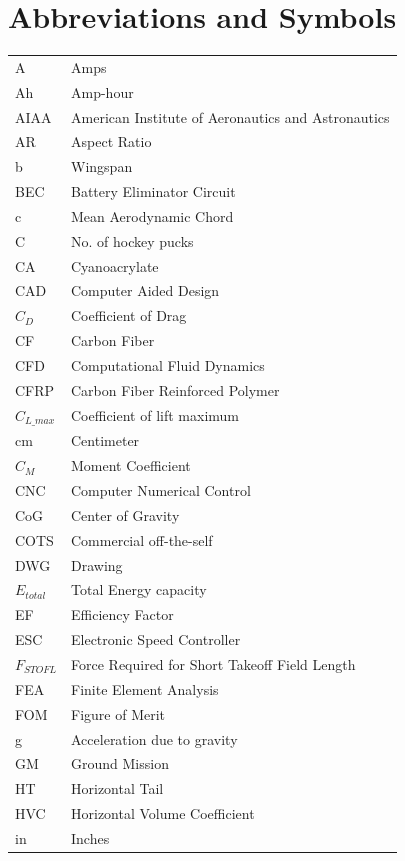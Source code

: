 \documentclass[10pt, letterpaper]{article}
\begin{document}
\section*{Abbreviations and Symbols}
{        %
\begin{minipage}{0.48\textwidth}
\centering
\begin{tabular}{ll}
A & Amps \\
Ah & Amp-hour \\
AIAA & American Institute of Aeronautics and Astronautics \\
AR & Aspect Ratio \\
b & Wingspan \\
BEC & Battery Eliminator Circuit \\
c & Mean Aerodynamic Chord \\
C & No. of hockey pucks \\
CA & Cyanoacrylate \\
CAD & Computer Aided Design \\
$C_D$ & Coefficient of Drag \\
CF & Carbon Fiber \\
CFD & Computational Fluid Dynamics \\
CFRP & Carbon Fiber Reinforced Polymer \\
$C_{L\_max}$ & Coefficient of lift maximum \\
cm & Centimeter \\
$C_M$ & Moment Coefficient \\
CNC & Computer Numerical Control \\
CoG & Center of Gravity \\
COTS & Commercial off-the-self \\
DWG & Drawing\\
$E_{total}$ & Total Energy capacity \\
EF & Efficiency Factor \\
ESC & Electronic Speed Controller \\
$F_{STOFL}$ & Force Required for Short Takeoff Field Length \\
FEA & Finite Element Analysis \\
FOM & Figure of Merit \\
g & Acceleration due to gravity \\
GM & Ground Mission \\
HT & Horizontal Tail \\
HVC & Horizontal Volume Coefficient \\
in & Inches \\

\end{tabular}
\end{minipage}}
\end{document}
